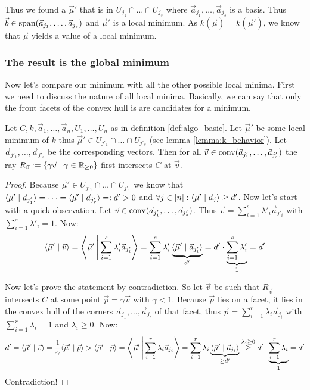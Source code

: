 Thus we found a $\vec\mu'$ that is in $U_{j_1} \cap \dots \cap U_{j_{s}}$ where $\vec a_{j_1}, \dots, \vec a_{j_s}$ is a basis. Thus $\vec b \in \operatorname{span}(\vec a_{j_1}, \dots, \vec a_{j_s})$ and $\vec\mu'$ is a local minimum. As $k(\vec\mu) = k(\vec\mu')$, we know that $\vec\mu$ yields a value of a local minimum. 

\subsubsection{The result is the global minimum}
Now let's compare our minimum with all the other possible local minima. First we need to discuss the nature of all local minima. Basically, we can say that only the front facets of the convex hull is are candidates for a minimum.

\begin{lemma}
    \label{lemma:local_minimum_faces_is_visible_from_origin}
    Let $C, k, \vec a_1, \dots, \vec a_n, U_1, \dots, U_n$ as in definition \ref{def:algo_basic}. Let $\vec\mu'$ be some local minimum of $k$ thus $\vec\mu' \in U_{j'_1}\cap \dots \cap U_{j'_s}$ (see lemma \ref{lemma:k_behavior}). Let $\vec a_{j'_1}, \dots, \vec a_{j'_s}$ be the corresponding vectors. Then for all $\vec v \in \operatorname{conv}(\vec a_{j'_1}, \dots, \vec a_{j'_s})$ the ray $R_{\vec v} := \{\gamma\vec v \mid \gamma \in \mathbb{R}_{\geq 0}\}$ first intersects $C$ at $\vec v$.
\end{lemma}
\begin{proof}
    Because $\vec \mu' \in U_{j'_1}\cap \dots \cap U_{j'_r}$ we know that $\langle \vec\mu' \mid \vec a_{j'_1} \rangle = \dots = \langle \vec\mu' \mid \vec a_{j'_r} \rangle =: d' > 0$ and $\forall j\in [n]: \langle \vec\mu' \mid \vec a_j \rangle \geq d'$. Now let's start with a quick observation. Let $\vec v \in \operatorname{conv}(\vec a_{j'_1}, \dots, \vec a_{j'_s})$. Thus $\vec v = \sum_{i=1}^{s}\lambda'_i\vec a_{j'_i}$ with $\sum_{i=1}^{s}\lambda'_i = 1$. Now:
    $$\langle \vec\mu' \mid \vec v \rangle = \left\langle \vec\mu' \,\middle|\, \sum_{i=1}^{s}\lambda'_i\vec a_{j'_i} \right\rangle = \sum_{i=1}^{s}\lambda'_i \underbrace{\langle \vec\mu' \mid \vec a_{j'_i} \rangle}_{d'} = d'\cdot \underbrace{\sum_{i=1}^{s}\lambda'_i}_1 = d'$$

    Now let's prove the statement by contradiction. So let $\vec v$ be such that $R_{\vec v}$ intersects $C$ at some point $\vec p = \gamma \vec v$ with $\gamma < 1$. Because $\vec p$ lies on a facet, it lies in the convex hull of the corners $\vec a_{j_1}, \dots, \vec a_{j_r}$ of that facet, thus $\vec p = \sum_{i=1}^{r}\lambda_i\vec a_{j_i}$ with $\sum_{i=1}^{r}\lambda_i = 1$ and $\lambda_i \geq 0$. Now:
    $$d' = \langle \vec\mu' \mid \vec v \rangle = \frac{1}{\gamma} \langle \vec\mu' \mid \vec p \rangle > \langle \vec\mu' \mid \vec p \rangle = \left\langle \vec\mu' \,\middle|\, \sum_{i=1}^{r}\lambda_i\vec a_{j_i} \right\rangle = \sum_{i=1}^{r}\lambda_i\underbrace{\langle \vec\mu' \mid \vec a_{j_i} \rangle}_{\geq d'} \stackrel{\lambda_i\geq0}{\geq} d'\cdot \underbrace{\sum_{i=1}^{r}\lambda_i}_1 = d'$$
    Contradiction!
\end{proof}

